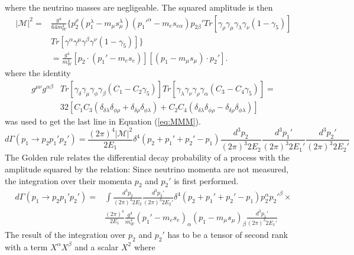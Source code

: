 \documentclass{outhesis}
\begin{document}
where the neutrino masses are negligeable. The squared amplitude is then
\begin{equation}
\begin{split}
|\mathcal{M}|^2  = & \frac{g^4}{64 m_W^4} \{p_2^{\rho}\left(p_1^{\lambda}-m_{\mu}s_{\mu}^{\lambda}\right)\left(p_1'^{\alpha}-m_{e}s_{e\alpha}\right)p_{2\beta}'Tr[\gamma_{\rho}\gamma_{\mu}
\gamma_{\lambda}\gamma_{\nu}\left(1-\gamma_5\right) ]  \\
& Tr[\gamma^{\alpha}\gamma^{\mu}\gamma^{\beta}\gamma^{\nu}\left(1-\gamma_5\right)]    \}\\
& = \frac{g^4}{m_W^4}[p_2\cdot\left(p_1'-m_e s_e \right) ] [\left(p_1 - m_{\mu}s_{\mu}\right) \cdot p_2'  ].  
\label{eq:MMM}
\end{split}
\end{equation}
where the identity 
\begin{equation}
\begin{split}
g^{\mu \nu}g^{\alpha \beta} &Tr[\gamma_{\delta}\gamma_{\mu}\gamma_{\phi}\gamma_{\beta}\left(C_1-C_2\gamma_5\right)] 
Tr[\gamma_{\lambda}\gamma_{\nu}\gamma_{\rho}\gamma_{\alpha}\left(C_3-C_4\gamma_5\right)] = \\
&32[C_1C_3\left(\delta_{\delta\lambda}\delta_{\phi\rho}+\delta_{\delta\rho}\delta_{\phi\lambda} \right)
+ C_2 C_4 \left(\delta_{\delta\lambda}\delta_{\phi\rho}-\delta_{\delta\rho}\delta_{\phi\lambda}\right)]
\end{split}
\end{equation}
was used to get the last line in Equation (\ref{eq:MMM}).
\begin{equation}
d\Gamma\left(p_1\to p_2p_1'p_2'\right) = \frac{\left(2\pi\right)^4 |\mathcal{M}|^2}{2E_1}\delta^4\left(p_2+p_1'+p_2'-p_1 \right)
\frac{d^3p_2}{\left(2\pi\right)^3 2E_2}\frac{d^3p_1'}{\left(2\pi\right)^3 2E_1'}\frac{d^3p_2'}{\left(2\pi\right)^3 2E_2'}
\end{equation}
The Golden rule relates the differential decay probability of a process with the amplitude squared by the relation:
Since neutrino momenta are not measured, the integration over their momenta $p_2$ and $p_2'$ is first performed. 
\begin{equation}
\begin{split}
d\Gamma\left(p_1\to p_2p_1'p_2'\right) = &\int\frac{d^3p_2}{\left(2\pi\right)^3 2E_2}\frac{d^3p_2'}{\left(2\pi\right)^3 2E_2'}\delta^4\left(p_2+p_1'+p_2'-p_1 \right)p_2^\alpha p_2'^\beta 
\times \\
& \frac{\left(2\pi\right)^4}{2E_1} \frac{g^4}{m_W^4} \left(p_1'-m_e s_e \right)_\alpha \left(p_1 - m_{\mu}s_{\mu}\right)_\beta
\frac{d^3p_1'}{\left(2\pi\right)^3 2E_1'}
\end{split}
\end{equation}
The result of the integration over $p_2$ and $p_2'$ has to be a tensor of second rank with a term $X^\alpha X^\beta$ and a scalar $X^2$ where 
 
\end{document}
